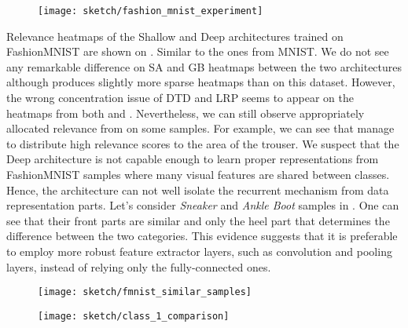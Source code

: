  \begin{figure}[!htb]
\centering
\texttt{[image: sketch/fashion\_mnist\_experiment]}
\label{fig:fashion_mnist_experiment}
\end{figure}

Relevance heatmaps of the Shallow and Deep architectures trained on  FashionMNIST  are shown on \addfigure{\ref{fig:fashion_mnist_experiment}}. Similar to the ones from MNIST. We do not see any remarkable difference on SA and GB heatmaps between the two architectures although  produces slightly more sparse heatmaps than  on this dataset. However, the wrong concentration issue of DTD and LRP seems to appear on the heatmaps from both  and . Nevertheless, we can still observe appropriately allocated relevance from  on some samples. For example, we can see  that  manage to distribute high relevance scores to the area of the trouser.  We suspect that the Deep architecture is not capable enough to learn proper representations from FashionMNIST samples where many visual features are shared between classes. Hence, the architecture can not well isolate the recurrent mechanism from data representation parts. Let's consider \textit{Sneaker} and \textit{Ankle Boot} samples in \addfigure{\ref{fig:fmnist_similar_samples}}. One can see that  their front parts are similar and only the heel part that determines the difference between the two categories. This evidence suggests that it is preferable to employ more robust feature extractor layers, such as convolution and pooling layers, instead of relying only the fully-connected ones.

 \begin{figure}[!htb]
\centering
\texttt{[image: sketch/fmnist\_similar\_samples]}
\label{fig:fmnist_similar_samples}
\end{figure}

 \begin{figure}[!htb]
\centering
\texttt{[image: sketch/class\_1\_comparison]}
\label{fig:class_1_comparison}
\end{figure}

